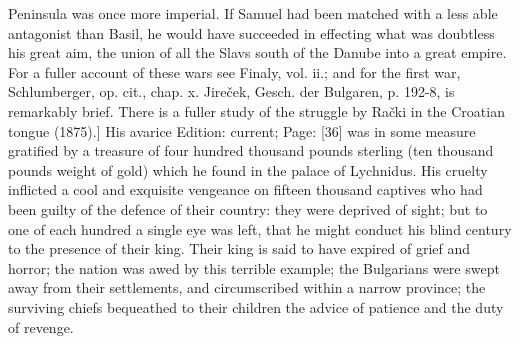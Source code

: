 {Peninsula was once more imperial. If Samuel had been matched with a less able antagonist than Basil, he would have succeeded in effecting what was doubtless his great aim, the union of all the Slavs south of the Danube into a great empire. For a fuller account of these wars see Finaly, vol. ii.; and for the first war, Schlumberger, op. cit., chap. x. Jireček, Gesch. der Bulgaren, p. 192-8, is remarkably brief. There is a fuller study of the struggle by Rački in the Croatian tongue (1875).]} His avarice Edition: current; Page: [36] was in some measure gratified by a treasure of four hundred thousand pounds sterling (ten thousand pounds weight of gold) which he found in the palace of Lychnidus. His cruelty inflicted a cool and exquisite vengeance on fifteen thousand captives who had been guilty of the defence of their country: they were deprived of sight; but to one of each hundred a single eye was left, that he might conduct his blind century to the presence of their king. Their king is said to have expired of grief and horror; the nation was awed by this terrible example; the Bulgarians were swept away from their settlements, and circumscribed within a narrow province; the surviving chiefs bequeathed to their children the advice of patience and the duty of revenge.

